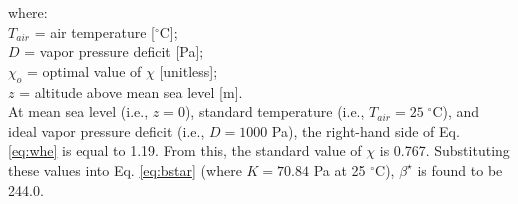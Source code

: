 \noindent where:\\
\indent $T_{air}$ = air temperature [${}^\circ$C];\\
\indent $D$ = vapor pressure deficit [Pa];\\
\indent $\chi_o$ = optimal value of $\chi$ [unitless];\\
\indent $z$ = altitude above mean sea level [m].\\

\noindent At mean sea level (i.e., $z = 0$), standard temperature (i.e., $T_{air} = 25\;{}^\circ$C), and ideal vapor pressure deficit (i.e., $D = 1000$ Pa), the right-hand side of Eq. \ref{eq:whe} is equal to 1.19. From this, the standard value of $\chi$ is 0.767. 
Substituting these values into Eq. \ref{eq:bstar} (where $K = 70.84$ Pa at 25 ${}^\circ$C), $\beta^\star$ is found to be 244.0. 

